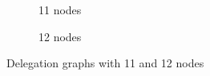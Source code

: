 \begin{figure}[h]
    \centering
    \begin{subfigure}[t]{0.45\textwidth}
        \centering
        \caption{11 nodes}
    \end{subfigure}
    \hfill
    \begin{subfigure}[t]{0.45\textwidth}
        \centering
        \caption{12 nodes}
    \end{subfigure}
    \caption{Delegation graphs with 11 and 12 nodes}
    \label{fig:random-11and12}
\end{figure}

